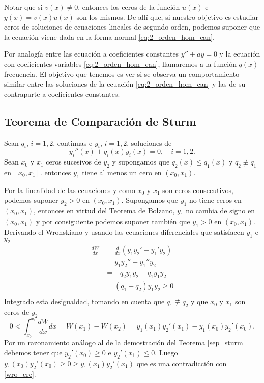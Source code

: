 Notar que si $v(x)\neq 0$, entonces los ceros de la función $u(x)$ e $y(x)=v(x)u(x)$ son los mismos. De allí que, si nuestro objetivo es estudiar ceros de soluciones de ecuaciones lineales de segundo orden, podemos suponer que la ecuación viene dada en la forma normal  \eqref{eq:2_orden_hom_can}.

Por  analogía  entre las ecuación a coeficientes constantes $y''+ay=0$ y la ecuación con coeficientes variables \eqref{eq:2_orden_hom_can}, llamaremos a la función $q(x)$ frecuencia. El objetivo que tenemos es ver si se observa un comportamiento similar entre las soluciones de la ecuación  \eqref{eq:2_orden_hom_can} y las de su contraparte a coeficientes constantes. 

\subsection{Teorema de Comparación de Sturm}

\begin{teorema} Sean $q_i$, $i=1,2$,  continuas e  $y_i$, $i=1,2$, soluciones de
\[ y_i''(x)+q_i(x)y_i(x)=0,\quad i=1,2.\]
Sean $x_0$ y $x_1$ ceros sucesivos de $y_2$ y supongamos que $q_2(x)\leq q_1(x)$ y $q_2\not\equiv q_1$ en $[x_0,x_1]$. entonces $y_1$ tiene al menos un cero en $(x_0,x_1)$. 
\end{teorema}
\begin{demo} Por la linealidad de las ecuaciones y como $x_0$ y $x_1$ son ceros consecutivos, podemos suponer $y_2>0$ en $(x_0,x_1)$. Supongamos que $y_1$ no tiene ceros en $(x_0,x_1)$, entonces en virtud del \href{http://es.wikipedia.org/wiki/Teorema_del_valor_intermedio}{Teorema de Bolzano}, $y_1$ no cambia de signo en $(x_0,x_1)$ y por consiguiente podemos suponer también que $y_1>0$ en $(x_0,x_1)$. Derivando el Wronskiano y usando las ecuaciones diferenciales que satisfacen $y_1$ e $y_2$ 
\[\begin{split}
\frac{dW}{dx} &= \frac{d}{dx} (y_1y_2'-y_1'y_2)\\
&=y_1y_2''-y_1''y_2\\
&=-q_2y_1y_2+q_1y_1y_2\\
&=(q_1-q_2)y_1y_2\geq 0\\
\end{split}
\]
Integrado esta desigualdad, tomando en cuenta que $q_1\not\equiv q_2$ y que $x_0$ y $x_1$ son ceros de $y_2$
\begin{equation}\label{wro_cre}0<\int_{x_0}^{x_1}\frac{dW}{dx}dx=W(x_1)-W(x_2)=y_1(x_1)y_2'(x_1)-y_1(x_0)y_2'(x_0).
\end{equation}
Por un razonamiento análogo al de la demostración del Teorema \ref{sep_sturm} debemos tener que $y_2'(x_0)\geq 0$ e $y_2'(x_1)\leq 0$. Luego $y_1(x_0)y_2'(x_0)\geq 0\geq y_1(x_1)y_2'(x_1)$ que es una contradicción con \eqref{wro_cre}.\end{demo}



